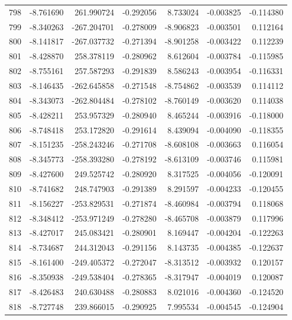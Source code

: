 \begin{tabular}{rrrrrrr}
 798 &  -8.761690 &  261.990724 & -0.292056 &   8.733024 &  -0.003825 & -0.114380 \\
 799 &  -8.340263 & -267.204701 & -0.278009 &  -8.906823 &  -0.003501 &  0.112164 \\
 800 &  -8.141817 & -267.037732 & -0.271394 &  -8.901258 &  -0.003422 &  0.112239 \\
 801 &  -8.428870 &  258.378119 & -0.280962 &   8.612604 &  -0.003784 & -0.115985 \\
 802 &  -8.755161 &  257.587293 & -0.291839 &   8.586243 &  -0.003954 & -0.116331 \\
 803 &  -8.146435 & -262.645858 & -0.271548 &  -8.754862 &  -0.003539 &  0.114112 \\
 804 &  -8.343073 & -262.804484 & -0.278102 &  -8.760149 &  -0.003620 &  0.114038 \\
 805 &  -8.428211 &  253.957329 & -0.280940 &   8.465244 &  -0.003916 & -0.118000 \\
 806 &  -8.748418 &  253.172820 & -0.291614 &   8.439094 &  -0.004090 & -0.118355 \\
 807 &  -8.151235 & -258.243246 & -0.271708 &  -8.608108 &  -0.003663 &  0.116054 \\
 808 &  -8.345773 & -258.393280 & -0.278192 &  -8.613109 &  -0.003746 &  0.115981 \\
 809 &  -8.427600 &  249.525742 & -0.280920 &   8.317525 &  -0.004056 & -0.120091 \\
 810 &  -8.741682 &  248.747903 & -0.291389 &   8.291597 &  -0.004233 & -0.120455 \\
 811 &  -8.156227 & -253.829531 & -0.271874 &  -8.460984 &  -0.003794 &  0.118068 \\
 812 &  -8.348412 & -253.971249 & -0.278280 &  -8.465708 &  -0.003879 &  0.117996 \\
 813 &  -8.427017 &  245.083421 & -0.280901 &   8.169447 &  -0.004204 & -0.122263 \\
 814 &  -8.734687 &  244.312043 & -0.291156 &   8.143735 &  -0.004385 & -0.122637 \\
 815 &  -8.161400 & -249.405372 & -0.272047 &  -8.313512 &  -0.003932 &  0.120157 \\
 816 &  -8.350938 & -249.538404 & -0.278365 &  -8.317947 &  -0.004019 &  0.120087 \\
 817 &  -8.426483 &  240.630488 & -0.280883 &   8.021016 &  -0.004360 & -0.124520 \\
 818 &  -8.727748 &  239.866015 & -0.290925 &   7.995534 &  -0.004545 & -0.124904 \\

\end{tabular}

